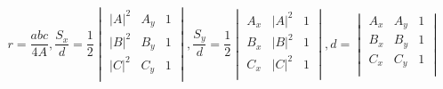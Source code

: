 \documentclass[12pt]{article}
\begin{document}
\[
    r = \frac{abc}{4A}, \frac{S_x}{d} = \frac{1}{2} \begin{vmatrix}
        |A|^2 & A_y & 1 \\
        |B|^2 & B_y & 1 \\
        |C|^2 & C_y & 1 \\
    \end{vmatrix}, \frac{S_y}{d} = \frac{1}{2} \begin{vmatrix}
        A_x & |A|^2 & 1 \\
        B_x & |B|^2 & 1 \\
        C_x & |C|^2 & 1 \\
    \end{vmatrix}, d = \begin{vmatrix}
        A_x & A_y & 1 \\
        B_x & B_y & 1 \\
        C_x & C_y & 1 \\
    \end{vmatrix}
\
\]
\end{document}
